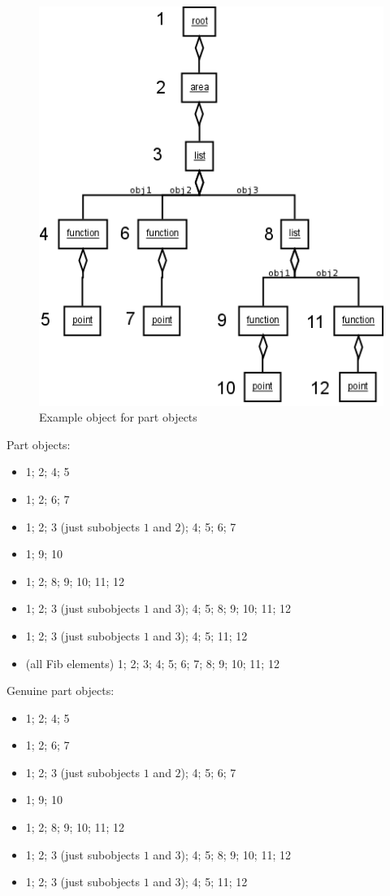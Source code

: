 \begin{figure}[htbp]
\begin{center}
  \includegraphics[scale=0.5]{order_elements}
\end{center}
\caption{Example object for part objects}
\label{figOrderFibElementsPartobjects}
\end{figure}


\bigskip\noindent
Part objects:
\begin{itemize}
 \item 1; 2; 4; 5
 \item 1; 2; 6; 7
 \item 1; 2; 3 (just subobjects $1$ and $2$); 4; 5; 6; 7
 \item 1; 9; 10
 \item 1; 2; 8; 9; 10; 11; 12
 \item 1; 2; 3 (just subobjects $1$ and $3$); 4; 5; 8; 9; 10; 11; 12
 \item 1; 2; 3 (just subobjects $1$ and $3$); 4; 5; 11; 12
 \item (all Fib elements) 1; 2; 3; 4; 5; 6; 7; 8; 9; 10; 11; 12
\end{itemize}

Genuine part objects:
\begin{itemize}
 \item 1; 2; 4; 5
 \item 1; 2; 6; 7
 \item 1; 2; 3 (just subobjects $1$ and $2$); 4; 5; 6; 7
 \item 1; 9; 10
 \item 1; 2; 8; 9; 10; 11; 12
 \item 1; 2; 3 (just subobjects $1$ and $3$); 4; 5; 8; 9; 10; 11; 12
 \item 1; 2; 3 (just subobjects $1$ and $3$); 4; 5; 11; 12
\end{itemize}

